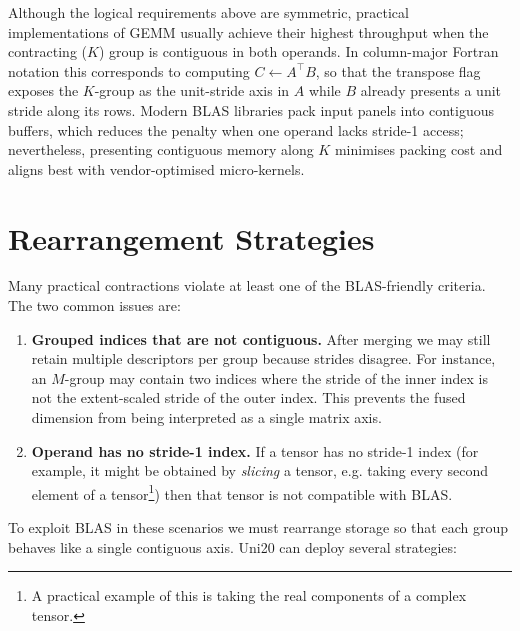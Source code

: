 \documentclass[11pt]{article}
\begin{document}
Although the logical requirements above are symmetric, practical implementations of GEMM usually
achieve their highest throughput when the contracting ($K$) group is contiguous in both operands.
In column-major Fortran notation this corresponds to computing $C \leftarrow A^\top B$, so that the
transpose flag exposes the $K$-group as the unit-stride axis in $A$ while $B$ already presents a unit
stride along its rows.  Modern BLAS libraries pack input panels into contiguous buffers, which
reduces the penalty when one operand lacks stride-1 access; nevertheless, presenting contiguous
memory along $K$ minimises packing cost and aligns best with vendor-optimised micro-kernels.

\section{Rearrangement Strategies}
Many practical contractions violate at least one of the BLAS-friendly criteria.  The two common
issues are:
\begin{enumerate}
  \item \textbf{Grouped indices that are not contiguous.}  After merging we may still retain
        multiple descriptors per group because strides disagree.  For instance, an $M$-group may
        contain two indices where the stride of the inner index is not the extent-scaled stride of
        the outer index.  This prevents the fused dimension from being interpreted as a single
        matrix axis.
  \item \textbf{Operand has no stride-1 index.}  If a tensor has no stride-1 index (for example,
        it might be obtained by \emph{slicing} a tensor, e.g. taking every second element of a
        tensor\footnote{A practical example of this is taking the real components of a complex
        tensor.}) then that tensor is not compatible with BLAS.
\end{enumerate}
To exploit BLAS in these scenarios we must rearrange storage so that each group behaves like a
single contiguous axis.  Uni20 can deploy several strategies:
\end{document}
